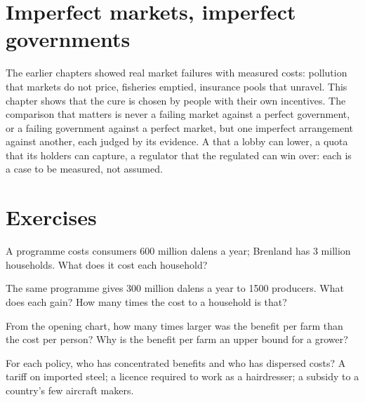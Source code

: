 \section{Imperfect markets, imperfect governments}\label{sec:g11:public-choice-first-look:comparison}

The earlier chapters showed real market failures with measured costs: pollution that markets do not price, fisheries emptied, insurance pools that unravel. This
chapter shows that the cure is chosen by people with their own incentives. The comparison that matters is never a failing market against a perfect government, or a
failing government against a perfect market, but one imperfect arrangement against another, each judged by its evidence. A  that a lobby can lower, a
quota that its holders can capture, a regulator that the regulated can win over: each is a case to be measured, not assumed.

\section{Exercises}

\begin{exercise}[$\star$]\label{exo:g11:public-choice-first-look:1}
A programme costs consumers 600 million dalens a year; Brenland has 3 million households. What does it cost each household?
\end{exercise}

\begin{exercise}[$\star$]\label{exo:g11:public-choice-first-look:2}
The same programme gives 300 million dalens a year to 1500 producers. What does each gain? How many times the cost to a household is that?
\end{exercise}

\begin{exercise}[$\star$]\label{exo:g11:public-choice-first-look:3}
From the opening chart, how many times larger was the benefit per farm than the cost per person? Why is the benefit per farm an upper bound for a grower?
\end{exercise}

\begin{exercise}[$\star$]\label{exo:g11:public-choice-first-look:4}
For each policy, who has concentrated benefits and who has dispersed costs? A tariff on imported steel; a licence required to work as a hairdresser; a subsidy to
a country's few aircraft makers.
\end{exercise}

